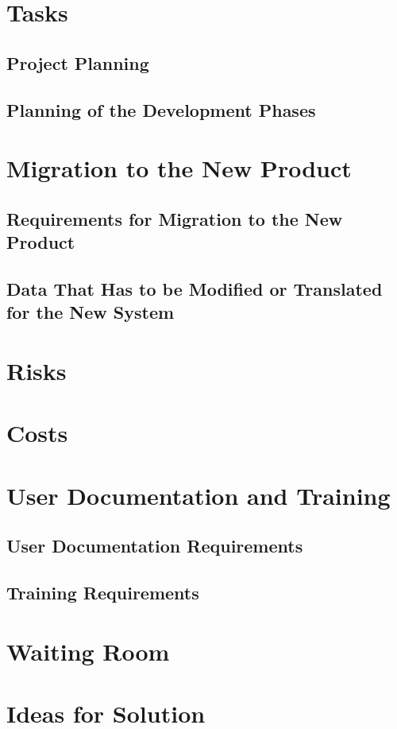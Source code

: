 \documentclass[]{article}
\begin{document}
\section{Tasks}
\subsection{Project Planning}
\subsection{Planning of the Development Phases}

\section{Migration to the New Product}
\subsection{Requirements for Migration to the New Product}
\subsection{Data That Has to be Modified or Translated for the New System}

\section{Risks}

\section{Costs}

\section{User Documentation and Training}
\subsection{User Documentation Requirements}
\subsection{Training Requirements}

\section{Waiting Room}

\section{Ideas for Solution}
\end{document}
